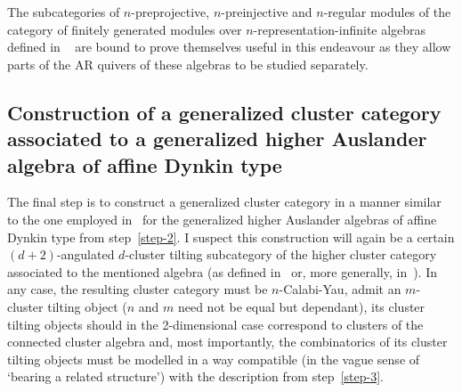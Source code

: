 \documentclass[a4paper,oneside,svgnames]{amsart}
\theoremstyle{plain}
\theoremstyle{definition}
\begin{document}
 The subcategories of $n$-preprojective, $n$-preinjective and $n$-regular
 modules of the category of finitely generated modules over
 $n$-representation-infinite algebras defined in ~\cite[Theorem 4.18]{hio} are
 bound to prove themselves useful in this endeavour as they allow parts of the
 AR quivers of these algebras to be studied separately.

 \subsection{Construction of a generalized cluster category associated to a
 generalized higher Auslander algebra of affine Dynkin type}

 The final step is to construct a generalized cluster category in a manner
 similar to the one employed in~\cite[Section~5]{ot} for the generalized higher
 Auslander algebras of affine Dynkin type from step~\ref{step-2}. I suspect this
 construction will again be a certain $(d+2)$-angulated $d$-cluster tilting
 subcategory of the higher cluster category associated to the mentioned algebra
 (as defined in~\cite{amiot1} or, more generally, in~\cite{guo}). In any case,
 the resulting cluster category must be $n$-Calabi-Yau, admit an $m$-cluster
 tilting object ($n$ and $m$ need not be equal but dependant), its cluster
 tilting objects should in the 2-dimensional case correspond to clusters of the
 connected cluster algebra and, most importantly, the combinatorics of its
 cluster tilting objects must be modelled in a way compatible (in the vague
 sense of `bearing a related structure') with the description from
 step~\ref{step-3}.
\end{document}

